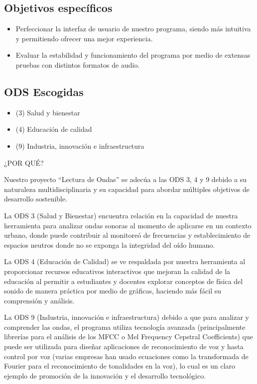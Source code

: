 \documentclass[letterpaper, 12pt]{article}
\begin{document}
\subsection*{Objetivos específicos}

\begin{itemize}[label=$\triangleright$]
	\item Perfeccionar la interfaz de usuario de nuestro programa,
	      siendo más intuitiva y permitiendo ofrecer una mejor
	      experiencia.

	\item Evaluar la estabilidad y funcionamiento del programa por
	      medio de extensas pruebas con distintos formatos de audio.
\end{itemize}

\subsection*{ODS Escogidas}

\begin{itemize}[label=$\triangleright$]
	\item (3) Salud y bienestar
	\item (4) Educación de calidad
	\item (9) Industria, innovación e infraestructura
\end{itemize}

¿POR QUÉ?

Nuestro proyecto ``Lectura de Ondas'' se adecúa a las ODS
3, 4 y 9 debido a su naturaleza multidisciplinaria y su
capacidad para abordar múltiples objetivos de desarrollo
sostenible.

La ODS 3 (Salud y Bienestar) encuentra relación en la
capacidad de nuestra herramienta para analizar ondas
sonoras al momento de aplicarse en un contexto urbano,
donde puede contribuir al monitoreó de frecuencias y
establecimiento de espacios neutros donde no se exponga la
integridad del oído humano.

La ODS 4 (Educación de Calidad) se ve respaldada por
nuestra herramienta al proporcionar recursos educativos
interactivos que mejoran la calidad de la educación al
permitir a estudiantes y docentes explorar conceptos de
física del sonido de manera práctica por medio de gráficas,
haciendo más fácil su comprensión y análisis.

La ODS 9 (Industria, innovación e infraestructura) debido a
que para analizar y comprender las ondas, el programa
utiliza tecnología avanzada (principalmente librerías para
el análisis de los MFCC o Mel Frequency Cepstral
Coefficients) que puede ser utilizada para diseñar
aplicaciones de reconocimiento de voz y hasta control por
voz (varias empresas han usado ecuaciones como la
transformada de Fourier para el reconocimiento de
tonalidades en la voz), lo cual es un claro ejemplo de
promoción de la innovación y el desarrollo tecnológico.
\end{document}
